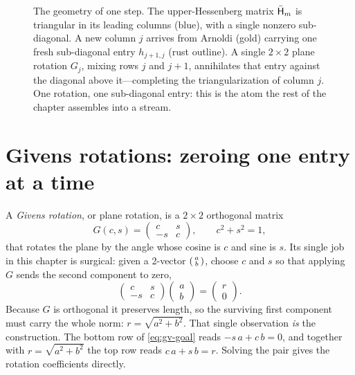 \begin{figure}[t]
\caption[A Givens rotation zeroing one sub-diagonal entry]{The geometry of one step.
The upper-Hessenberg matrix $\bar{\mathsf{H}}_m$ is triangular in its leading columns
(blue), with a single nonzero sub-diagonal. A new column $j$ arrives from Arnoldi
(gold) carrying one fresh sub-diagonal entry $h_{j+1,j}$ (rust outline). A single
$2\times2$ plane rotation $G_j$, mixing rows $j$ and $j{+}1$, annihilates that entry
against the diagonal above it---completing the triangularization of column $j$. One
rotation, one sub-diagonal entry: this is the atom the rest of the chapter assembles
into a stream.}
\label{fig:gv-hessenberg}
\end{figure}

\section{Givens rotations: zeroing one entry at a time}
\label{sec:gv-rotations}

A \emph{Givens rotation}, or plane rotation, is a $2\times2$ orthogonal matrix
\begin{equation}
\label{eq:gv-matrix}
  G(c,s) = \begin{pmatrix} c & s \\ -s & c \end{pmatrix},
  \qquad c^2 + s^2 = 1,
\end{equation}
that rotates the plane by the angle whose cosine is $c$ and sine is $s$. Its single
job in this chapter is surgical: given a 2-vector $\begin{psmallmatrix} a \\ b
\end{psmallmatrix}$, choose $c$ and $s$ so that applying $G$ sends the second
component to zero,
\begin{equation}
\label{eq:gv-goal}
  \begin{pmatrix} c & s \\ -s & c \end{pmatrix}
  \begin{pmatrix} a \\ b \end{pmatrix}
  = \begin{pmatrix} r \\ 0 \end{pmatrix}.
\end{equation}
Because $G$ is orthogonal it preserves length, so the surviving first component must
carry the whole norm: $r = \sqrt{a^2 + b^2}$. That single observation \emph{is} the
construction. The bottom row of \cref{eq:gv-goal} reads $-s\,a + c\,b = 0$, and
together with $r = \sqrt{a^2+b^2}$ the top row reads $c\,a + s\,b = r$. Solving the
pair gives the rotation coefficients directly.

